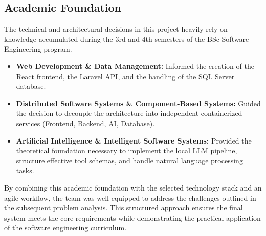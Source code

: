 \subsection{Academic Foundation}
The technical and architectural decisions in this project heavily rely on knowledge accumulated during the 3rd and 4th semesters of the BSc Software Engineering program.
\begin{itemize}
    \item \textbf{Web Development \& Data Management:} Informed the creation of the React frontend, the Laravel API, and the handling of the SQL Server database.
    \item \textbf{Distributed Software Systems \& Component-Based Systems:} Guided the decision to decouple the architecture into independent containerized services (Frontend, Backend, AI, Database).
    \item \textbf{Artificial Intelligence \& Intelligent Software Systems:} Provided the theoretical foundation necessary to implement the local LLM pipeline, structure effective tool schemas, and handle natural language processing tasks.
\end{itemize}

By combining this academic foundation with the selected technology stack and an agile workflow, the team was well-equipped to address the challenges outlined in the subsequent problem analysis. This structured approach ensures the final system meets the core requirements while demonstrating the practical application of the software engineering curriculum.
\pagebreak